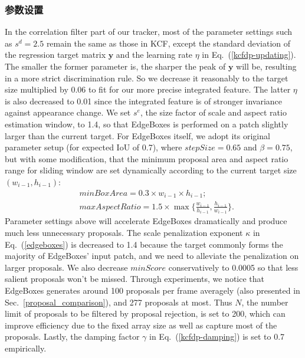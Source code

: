 \subsubsection{参数设置}
\label{param_setup}
In the correlation filter part of our tracker, most of the parameter settings such as $s^d=2.5$ remain the same as those in KCF,
except the standard deviation of the regression target matrix $\mathbf{y}$ and the learning rate $\eta$ in Eq.~(\ref{kcfdp-updating}). 
The smaller the former parameter is, the sharper the peak of $\mathbf{y}$ will be, resulting in a more strict discrimination rule.
So we decrease it reasonably to the target size multiplied by 0.06
to fit for our more precise integrated feature.
The latter $\eta$ is also decreased to 0.01 since the integrated feature is of stronger invariance against appearance change. 
We set $s^e$, the size factor of scale and aspect ratio estimation window, to 1.4, so that EdgeBoxes is performed on a patch slightly larger than the current target.
For EdgeBoxes itself, we adopt its original parameter setup (for expected IoU of 0.7), where $stepSize=0.65$ and $\beta=0.75$, but with some modification,
that the minimum proposal area and aspect ratio range for sliding window are set dynamically according to the current target size $(w_{i-1},h_{i-1})$:
\begin{equation}
\begin{aligned}
	&minBoxArea=0.3\times w_{i-1}\times h_{i-1};\\
	&maxAspectRatio=1.5\times \max\{\frac{w_{i-1}}{h_{i-1}},\frac{h_{i-1}}{w_{i-1}}\}.
	\label{EBfactor}
\end{aligned}
\end{equation}
Parameter settings above will accelerate EdgeBoxes dramatically and produce much less unnecessary proposals.
The scale penalization exponent $\kappa$ in Eq.~(\ref{edgeboxes}) is decreased to 1.4 because the target commonly forms the majority of EdgeBoxes' input patch,
and we need to alleviate the penalization on larger proposals.
We also decrease $minScore$ conservatively to 0.0005 so that less salient proposals won't be missed.
Through experiments, we notice that EdgeBoxes generates around 100 proposals per frame averagely (also presented in Sec.~\ref{proposal_comparison}),
and 277 proposals at most.
Thus $N$, the number limit of proposals to be filtered by proposal rejection, is set to 200,
which can improve efficiency due to the fixed array size as well as capture most of the proposals.
Lastly, the damping factor $\gamma$ in Eq.~(\ref{kcfdp-damping}) is set to 0.7 empirically.
